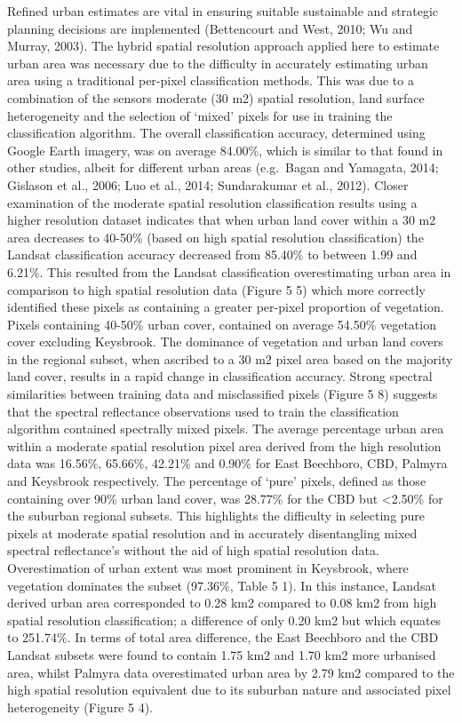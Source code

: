 \documentclass[]{book}
\begin{document}
Refined urban estimates are vital in ensuring suitable sustainable and
strategic planning decisions are implemented (Bettencourt and West,
2010; Wu and Murray, 2003). The hybrid spatial resolution approach
applied here to estimate urban area was necessary due to the difficulty
in accurately estimating urban area using a traditional per-pixel
classification methods. This was due to a combination of the sensors
moderate (30 m2) spatial resolution, land surface heterogeneity and the
selection of `mixed' pixels for use in training the classification
algorithm. The overall classification accuracy, determined using Google
Earth imagery, was on average 84.00\%, which is similar to that found in
other studies, albeit for different urban areas (e.g.~Bagan and
Yamagata, 2014; Gislason et al., 2006; Luo et al., 2014; Sundarakumar et
al., 2012). Closer examination of the moderate spatial resolution
classification results using a higher resolution dataset indicates that
when urban land cover within a 30 m2 area decreases to 40-50\% (based on
high spatial resolution classification) the Landsat classification
accuracy decreased from 85.40\% to between 1.99 and 6.21\%. This
resulted from the Landsat classification overestimating urban area in
comparison to high spatial resolution data (Figure 5 5) which more
correctly identified these pixels as containing a greater per-pixel
proportion of vegetation. Pixels containing 40-50\% urban cover,
contained on average 54.50\% vegetation cover excluding Keysbrook. The
dominance of vegetation and urban land covers in the regional subset,
when ascribed to a 30 m2 pixel area based on the majority land cover,
results in a rapid change in classification accuracy. Strong spectral
similarities between training data and misclassified pixels (Figure 5 8)
suggests that the spectral reflectance observations used to train the
classification algorithm contained spectrally mixed pixels. The average
percentage urban area within a moderate spatial resolution pixel area
derived from the high resolution data was 16.56\%, 65.66\%, 42.21\% and
0.90\% for East Beechboro, CBD, Palmyra and Keysbrook respectively. The
percentage of `pure' pixels, defined as those containing over 90\% urban
land cover, was 28.77\% for the CBD but \textless{}2.50\% for the
suburban regional subsets. This highlights the difficulty in selecting
pure pixels at moderate spatial resolution and in accurately
disentangling mixed spectral reflectance's without the aid of high
spatial resolution data. Overestimation of urban extent was most
prominent in Keysbrook, where vegetation dominates the subset (97.36\%,
Table 5 1). In this instance, Landsat derived urban area corresponded to
0.28 km2 compared to 0.08 km2 from high spatial resolution
classification; a difference of only 0.20 km2 but which equates to
251.74\%. In terms of total area difference, the East Beechboro and the
CBD Landsat subsets were found to contain 1.75 km2 and 1.70 km2 more
urbanised area, whilst Palmyra data overestimated urban area by 2.79 km2
compared to the high spatial resolution equivalent due to its suburban
nature and associated pixel heterogeneity (Figure 5 4).
\end{document}
